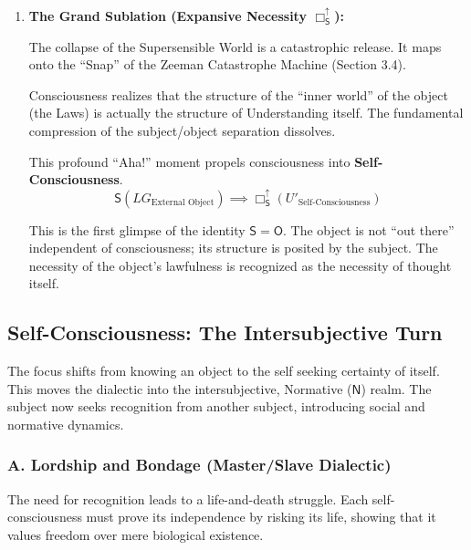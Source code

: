 \documentclass[12pt]{book}
\newcommand{\SBoxUp}{\Box_{\mathsf{S}}^{\uparrow}}
\begin{document}
\begin{enumerate}
The rigid separation between Inner (Essence) and Outer (Appearance) cannot be maintained. The tension ($A$) is maximal. The Supersensible World is revealed to be a projection of Understanding itself.

\item \textbf{The Grand Sublation (Expansive Necessity $\SBoxUp$):}

The collapse of the Supersensible World is a catastrophic release. It maps onto the ``Snap'' of the Zeeman Catastrophe Machine (Section 3.4).

Consciousness realizes that the structure of the ``inner world'' of the object (the Laws) is actually the structure of Understanding itself. The fundamental compression of the subject/object separation dissolves.

This profound ``Aha!'' moment propels consciousness into \textbf{Self-Consciousness}.
\[
\mathsf{S}(LG_{\text{External Object}}) \implies \SBoxUp(U'_{\text{Self-Consciousness}})
\]

This is the first glimpse of the identity $\mathsf{S} = \mathsf{O}$. The object is not ``out there'' independent of consciousness; its structure is posited by the subject. The necessity of the object's lawfulness is recognized as the necessity of thought itself.
\end{enumerate}

\subsection{Self-Consciousness: The Intersubjective Turn}

The focus shifts from knowing an object to the self seeking certainty of itself. This moves the dialectic into the intersubjective, Normative ($\mathsf{N}$) realm. The subject now seeks recognition from another subject, introducing social and normative dynamics.

\subsubsection{A. Lordship and Bondage (Master/Slave Dialectic)}

The need for recognition leads to a life-and-death struggle. Each self-consciousness must prove its independence by risking its life, showing that it values freedom over mere biological existence.
\end{document}
